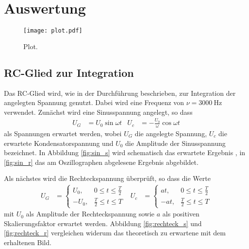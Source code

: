 \section{Auswertung}
\label{sec:Auswertung}

\begin{figure}
  \centering
  \texttt{[image: plot.pdf]}
  \caption{Plot.}
  \label{fig:plot}
\end{figure}


%    
%

\subsection{RC-Glied zur Integration}
Das RC-Glied wird, wie in der Durchführung beschrieben, zur Integration der angelegten Spannung genutzt.
Dabei wird eine Frequenz von $\nu = \SI{3000}{\hertz}$ verwendet.
Zunächst wird eine Sinusspannung angelegt, so dass
\begin{align}
U_G &= U_0\sin{\omega t}  & U_c &= -\frac{U_0}{\omega}\cos{\omega t}
\end{align}
als Spannungen erwartet werden, wobei $U_G$ die angelegte Spannung, $U_c$ die erwartete Kondensatorspannung und $U_0$ die Amplitude der Sinusspannung bezeichnet.
In Abbildung \ref{fig:sin_s} wird schematisch das erwartete Ergebnis , in \ref{fig:sin_r} das am Oszillographen abgelesene Ergebnis abgebildet.


Als nächstes wird die Rechteckspannung überprüft, so dass die Werte
\begin{align}
  U_G &=
  \begin{cases}
    U_0 , &  0 \leq t \leq \frac{T}{2} \\
    -U_0 , & \frac{T}{2} \leq t \leq T
  \end{cases}
   & U_c &=
  \begin{cases}
    at , &  0 \leq t \leq \frac{T}{2} \\
    -at , & \frac{T}{2} \leq t \leq T
  \end{cases}
\end{align}
mit $U_0$ als Amplitude der Rechteckspannung sowie $a$ als positiven Skalierungsfaktor erwartet werden.
Abbildung \ref{fig:rechteck_s} und \ref{fig:rechteck_r} vergleichen widerum das theoretisch zu erwartene mit dem erhaltenen Bild.

